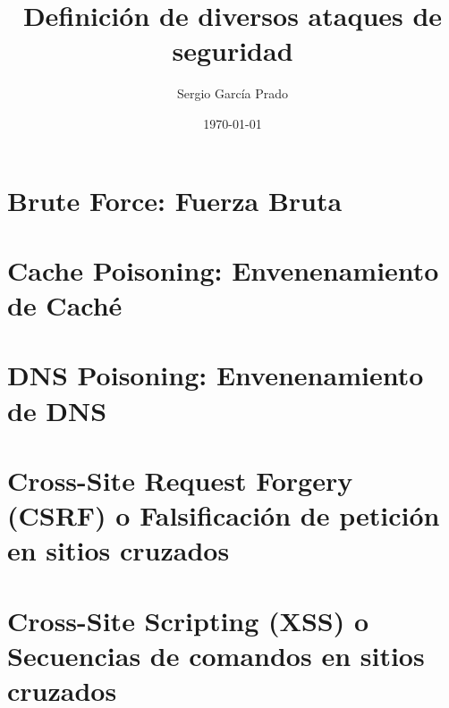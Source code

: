 \documentclass[10pt, a4paper,spanish]{article}
\title{\vspace{-15mm}\fontsize{24pt}{10pt}\selectfont\textbf{Definición de diversos ataques de seguridad}} %
\author{Sergio García Prado}
\date{\today}
\begin{document}
	\maketitle %
	\thispagestyle{fancy} %



    \section{Brute Force: Fuerza Bruta}
        \paragraph{}


    \section{Cache Poisoning: Envenenamiento de Caché}
        \paragraph{}


    \section{DNS Poisoning: Envenenamiento de DNS}
        \paragraph{}


    \section{Cross-Site Request Forgery (CSRF) o Falsificación de petición en sitios cruzados}
        \paragraph{}


    \section{Cross-Site Scripting (XSS) o Secuencias de comandos en sitios cruzados}
        \paragraph{}
\end{document}
